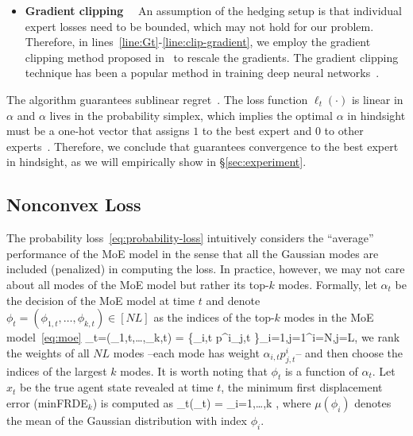 \begin{itemize}
\item {\bf Gradient clipping} \ \ An assumption of the hedging setup is that individual expert losses need to be bounded, which may not hold for our problem. Therefore, in lines~\ref{line:Gt}-\ref{line:clip-gradient}, we employ the gradient clipping method proposed in~\cite{cutkosky2019artificial} to rescale the gradients. The gradient clipping technique has been a popular method in training deep neural networks~\cite{pascanu2012understanding,gorbunov2020stochastic,zhang2020adaptive}.


\end{itemize}



The \squint algorithm guarantees sublinear regret~\cite[
Theorem 4]{koolen2015secondorder}. The loss function $\ell_t(\cdot)$ is linear in $\alpha$ and $\alpha$ lives in the probability simplex, which implies the optimal $\alpha$ in hindsight must be a one-hot vector that assigns $1$ to the best expert and $0$ to other experts~\cite{convexanalysis}. Therefore, we conclude that \squint guarantees convergence to the best expert in hindsight, as we will empirically show in \S\ref{sec:experiment}.


\subsection{Nonconvex Loss}
\label{sec:nonconvex-loss}


The probability loss~\eqref{eq:probability-loss} intuitively considers the ``average'' performance of the MoE model in the sense that all the Gaussian modes are included (penalized) in computing the loss. In practice, however, we may not care about all modes of the MoE model but rather its top-$k$ modes. Formally, let $\alpha_t$ be the decision of the MoE model at time $t$ and denote $\phi_t=(\phi_{1,t},\dots,\phi_{k,t}) \in [NL]$ as the indices of the top-$k$ modes in the MoE model~\eqref{eq:moe}
\bea \label{eq:argtopk}
\phi_t=(\phi_{1,t},\dots,\phi_{k,t}) = \{\alpha_{i,t} p^i_{j,t} \}_{i=1,j=1}^{i=N,j=L},
\eea
\ie we rank the weights of all $NL$ modes --each mode has weight $\alpha_{i,t} p^i_{j,t}$-- and then choose the indices of the largest $k$ modes. It is worth noting that $\phi_t$ is a function of $\alpha_t$. Let $x_t$ be the true agent state revealed at time $t$, the minimum first displacement error (minFRDE$_k$) is computed as 
\bea \label{eq:minFRDEk}
\ell_t(\alpha_t) = \min_{i=1,\dots,k} , 
\eea 
where $\mu(\phi_i)$ denotes the mean of the Gaussian distribution with index $\phi_i$.

